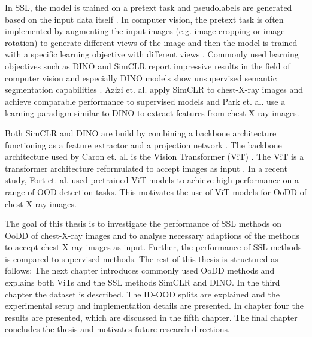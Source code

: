 In SSL, the model is trained on a pretext task and pseudolabels are generated based on the input data itself \citep{Jaiswal2021}.
In computer vision, the pretext task is often implemented by augmenting the input images (e.g. image cropping or image rotation) to generate different views of the image and then the model is trained with a specific learning objective with different views \citep{Jaiswal2020}.
Commonly used learning objectives such as DINO \citep{Caron2021} and SimCLR \citep{Chen2020} report impressive results in the field of computer vision and especially DINO models show unsupervised semantic segmentation capabilities \citep{Caron2021}.
Azizi et. al. \citep{Azizi2021} apply SimCLR to chest-X-ray images and achieve comparable performance to supervised models and Park et. al. \citep{Park2022} use a learning paradigm similar to DINO to extract features from chest-X-ray images.
\par
Both SimCLR and DINO are build by combining a backbone architecture functioning as a feature extractor and a projection network \citep{Caron2021,Chen2020}. 
The backbone architecture used by Caron et. al. is the Vision Transformer (ViT) \citep{Caron2021}.
The ViT is a transformer architecture \citep{Vaswani2017} reformulated to accept images as input \citep{Dosovitskiy2020}.
In a recent study, Fort et. al. \citep{Fort2021} used pretrained ViT models to achieve high performance on a range of OOD detection tasks.
This motivates the use of ViT models for OoDD of chest-X-ray images.
\par
The goal of this thesis is to investigate the performance of SSL methods on OoDD of chest-X-ray images and to analyse necessary adaptions of the methods to accept chest-X-ray images as input.
Further, the performance of SSL methods is compared to supervised methods.
The rest of this thesis is structured as follows: The next chapter introduces commonly used OoDD methods and explains both ViTs and the SSL methods SimCLR and DINO.
In the third chapter the dataset is described.
The ID-OOD splits are explained and the experimental setup and implementation details are presented.
In chapter four the results are presented, which are discussed in the fifth chapter.
The final chapter concludes the thesis and motivates future research directions.

